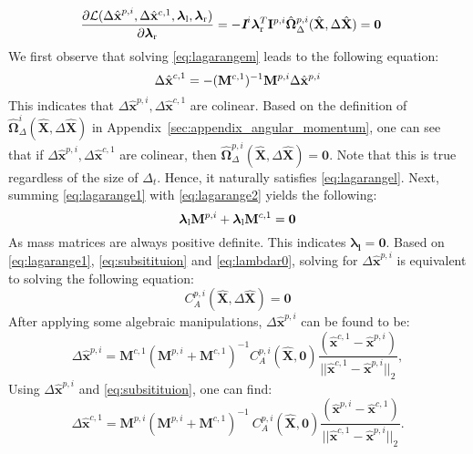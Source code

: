 \begin{align}
    \label{eq:lagarangel}
    \begin{split}
     & \frac{\partial \mathcal{L}(\Delta \hat{\textbf{x}}^{p, i}, \Delta  \hat{\mathbf{x}}^{c,1},  \boldsymbol{\lambda}_\text{l}, \boldsymbol{\lambda}_\text{r})}{\partial \boldsymbol{\lambda}_\text{r}} = 
      - \textit{\textbf{I}}^i   \boldsymbol{\lambda}^T_\text{r}\mathbf{I}^{p, i}   \hat{\boldsymbol{\Omega}}^{p, i} _\Delta (\hat{\mathbf{X}},\Delta \hat{\mathbf{X}} ) = \textbf{0}
     \end{split}
\end{align}
We first observe that solving \eqref{eq:lagarangem} leads to the following equation:
\begin{equation}
     \Delta \hat{\textbf{x}}^{c, 1} = -(\mathbf{M}^{c, 1})^{-1}\mathbf{M}^{p, i}  \Delta \hat{\mathbf{x}}^{p,i}
     \label{eq:subsitituion}
\end{equation}
This indicates that $\Delta \hat{\textbf{x}}^{p, i}, \Delta  \hat{\mathbf{x}}^{c,1}$ are colinear.
Based on the definition of $ \hat{\boldsymbol{\Omega}}^{i} _\Delta (\hat{\mathbf{X}},\Delta \hat{\mathbf{X}} )$ in Appendix~\ref{sec:appendix_angular_momentum}, one can see that if $\Delta \hat{\textbf{x}}^{p, i}, \Delta  \hat{\mathbf{x}}^{c,1}$ are colinear, then $ \hat{\boldsymbol{\Omega}}^{p, i} _\Delta (\hat{\mathbf{X}},\Delta \hat{\mathbf{X}} ) = \textbf{0}$. 
Note that this is true regardless of the size of $\Delta_t$.
Hence, it naturally satisfies \eqref{eq:lagarangel}.
Next, summing \eqref{eq:lagarange1} with \eqref{eq:lagarange2} yields the following:
\begin{equation} 
\boldsymbol{\lambda}_\text{l}\mathbf{M}^{p, i} + \boldsymbol{\lambda}_\text{l}\mathbf{M}^{c, 1} = \textbf{0}
\label{eq:lambdar0}
\end{equation}
As mass matrices are always positive definite.
This indicates $\boldsymbol{\lambda_l} = \textbf{0}$.
Based on \eqref{eq:lagarange1}, \eqref{eq:subsitituion} and \eqref{eq:lambdar0}, solving for $\Delta  \hat{\mathbf{x}}^{p,i}$ is equivalent to solving the following equation:
\begin{equation}
    C^{p,i}_A(\hat{\mathbf{X}}, \Delta \hat{\mathbf{X}}) = \textbf{0}
\end{equation}
After applying some algebraic manipulations, $\Delta \hat{\mathbf{x}}^{p, i}$ can be found to be:
\begin{equation*}
    \label{eq:momentum_solution1} 
  \Delta \hat{\mathbf{x}}^{p, i} =  \mathbf{M}^{c, 1} (\mathbf{M}^{p, i}+\mathbf{M}^{c, 1})^{-1}  C^{p,i}_A(\hat{\mathbf{X}},\mathbf{0}) \frac{(\hat{\mathbf{x}}^{c, 1} - \hat{\mathbf{x}}^{p, i})}{||\hat{\mathbf{x}}^{c, 1} - \hat{\mathbf{x}}^{p, i}||_2},
\end{equation*}
Using $\Delta \hat{\mathbf{x}}^{p, i}$ and \eqref{eq:subsitituion}, one can find:
\begin{equation*}
    \label{eq:momentum_solution2} 
     \Delta \hat{\mathbf{x}}^{c, 1} =  \mathbf{M}^{p, i}  (\mathbf{M}^{p, i}+\mathbf{M}^{c, 1})^{-1}
    \ C^{p,i}_A(\hat{\mathbf{X}},\mathbf{0}) \frac{(\hat{\mathbf{x}}^{p, i} - \hat{\mathbf{x}}^{c, 1})}{||\hat{\mathbf{x}}^{c, 1} - \hat{\mathbf{x}}^{p, i}||_2}.
\end{equation*}

